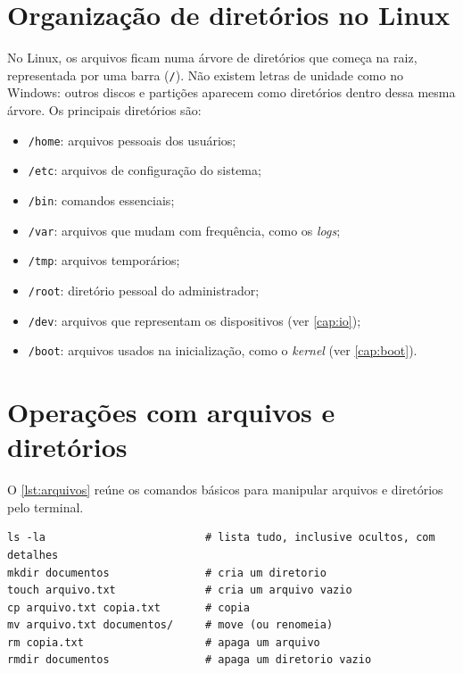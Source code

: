 \section{Organização de diretórios no Linux}\label{sec:diretorios}

No Linux, os arquivos ficam numa árvore de diretórios que começa na raiz, representada por uma
barra (\texttt{/}). Não existem letras de unidade como no Windows: outros discos e partições
aparecem como diretórios dentro dessa mesma árvore. Os principais diretórios são:

\begin{itemize}
    \item \texttt{/home}: arquivos pessoais dos usuários;
    \item \texttt{/etc}: arquivos de configuração do sistema;
    \item \texttt{/bin}: comandos essenciais;
    \item \texttt{/var}: arquivos que mudam com frequência, como os \textit{logs};
    \item \texttt{/tmp}: arquivos temporários;
    \item \texttt{/root}: diretório pessoal do administrador;
    \item \texttt{/dev}: arquivos que representam os dispositivos (ver \autoref{cap:io});
    \item \texttt{/boot}: arquivos usados na inicialização, como o \textit{kernel}
    (ver \autoref{cap:boot}).
\end{itemize}

\section{Operações com arquivos e diretórios}\label{sec:operacoes-arquivos}

O \autoref{lst:arquivos} reúne os comandos básicos para manipular arquivos e diretórios pelo
terminal.

\begin{lstlisting}[caption={Comandos básicos de manipulação de arquivos},label={lst:arquivos}]
ls -la                         # lista tudo, inclusive ocultos, com detalhes
mkdir documentos               # cria um diretorio
touch arquivo.txt              # cria um arquivo vazio
cp arquivo.txt copia.txt       # copia
mv arquivo.txt documentos/     # move (ou renomeia)
rm copia.txt                   # apaga um arquivo
rmdir documentos               # apaga um diretorio vazio
\end{lstlisting}

